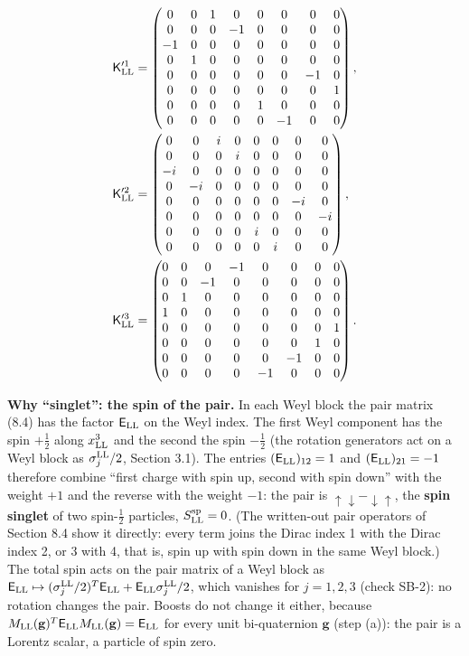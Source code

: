 \documentclass[
  10pt,
]{article}
\begin{document}
\[\begin{aligned}\mathsf K'^1_{\rm LL}&=\begin{pmatrix}0&0&1&0&0&0&0&0\\0&0&0&-1&0&0&0&0\\-1&0&0&0&0&0&0&0\\0&1&0&0&0&0&0&0\\0&0&0&0&0&0&-1&0\\0&0&0&0&0&0&0&1\\0&0&0&0&1&0&0&0\\0&0&0&0&0&-1&0&0\end{pmatrix},\\ \mathsf K'^2_{\rm LL}&=\begin{pmatrix}0&0&i&0&0&0&0&0\\0&0&0&i&0&0&0&0\\-i&0&0&0&0&0&0&0\\0&-i&0&0&0&0&0&0\\0&0&0&0&0&0&-i&0\\0&0&0&0&0&0&0&-i\\0&0&0&0&i&0&0&0\\0&0&0&0&0&i&0&0\end{pmatrix},\\ \mathsf K'^3_{\rm LL}&=\begin{pmatrix}0&0&0&-1&0&0&0&0\\0&0&-1&0&0&0&0&0\\0&1&0&0&0&0&0&0\\1&0&0&0&0&0&0&0\\0&0&0&0&0&0&0&1\\0&0&0&0&0&0&1&0\\0&0&0&0&0&-1&0&0\\0&0&0&0&-1&0&0&0\end{pmatrix}.\end{aligned}\]

\textbf{Why ``singlet'': the spin of the pair.} In each Weyl block the
pair matrix (8.4) has the factor \(\mathsf E_{\rm LL}\) on the Weyl
index. The first Weyl component has the spin \(+\tfrac12\) along
\(x^3_{\rm LL}\) and the second the spin \(-\tfrac12\) (the rotation
generators act on a Weyl block as \(\sigma^{\rm LL}_j/2\), Section 3.1).
The entries \((\mathsf E_{\rm LL})_{12}=1\) and
\((\mathsf E_{\rm LL})_{21}=-1\) therefore combine ``first charge with
spin up, second with spin down'' with the weight \(+1\) and the reverse
with the weight \(-1\): the pair is
\(\uparrow\downarrow-\downarrow\uparrow\), the \textbf{spin singlet} of
two spin-\(\tfrac12\) particles, \(S^{\rm sp}_{\rm LL}=0\). (The
written-out pair operators of Section 8.4 show it directly: every term
joins the Dirac index 1 with the Dirac index 2, or 3 with 4, that is,
spin up with spin down in the same Weyl block.) The total spin acts on
the pair matrix of a Weyl block as
\(\mathsf E_{\rm LL}\mapsto(\sigma^{\rm LL}_j/2)^T\mathsf E_{\rm LL}+\mathsf E_{\rm LL}\sigma^{\rm LL}_j/2\),
which vanishes for \(j=1,2,3\) (check SB-2): no rotation changes the
pair. Boosts do not change it either, because
\(M_{\rm LL}(\mathbf g)^T\mathsf E_{\rm LL}M_{\rm LL}(\mathbf g)=\mathsf E_{\rm LL}\)
for every unit bi-quaternion \(\mathbf g\) (step (a)): the pair is a
Lorentz scalar, a particle of spin zero.
\end{document}
